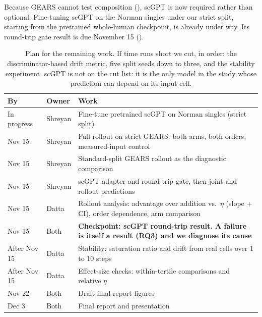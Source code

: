 Because GEARS cannot test composition (), scGPT is now required rather than
optional. Fine-tuning scGPT on the Norman singles under our strict split, starting from the
pretrained whole-human checkpoint, is already under way. Its round-trip gate result is due
November 15 ().

\begin{table}[htb]
\centering
\small
\begin{tabularx}{\linewidth}{llX}
\toprule
By & Owner & Work \\
\midrule
In progress & Shreyan & Fine-tune pretrained scGPT on Norman singles (strict split) \\
Nov 15 & Shreyan & Full rollout on strict GEARS: both arms, both orders, measured-input control \\
Nov 15 & Shreyan & Standard-split GEARS rollout as the diagnostic comparison \\
Nov 15 & Shreyan & scGPT adapter and round-trip gate, then joint and rollout predictions \\
Nov 15 & Datta & Rollout analysis: advantage over addition vs.\ $\eta$ (slope + CI), order dependence, arm comparison \\
\midrule
Nov 15 & Both & \textbf{Checkpoint: scGPT round-trip result. A failure is itself a result (RQ3) and we diagnose its cause} \\
\midrule
After Nov 15 & Datta & Stability: saturation ratio and drift from real cells over 1 to 10 steps \\
After Nov 15 & Datta & Effect-size checks: within-tertile comparisons and relative $\eta$ \\
Nov 22 & Both & Draft final-report figures \\
Dec 3 & Both & Final report and presentation \\
\bottomrule
\end{tabularx}
\caption{Plan for the remaining work. If time runs short we cut, in order: the
discriminator-based drift metric, five split seeds down to three, and the stability experiment.
scGPT is not on the cut list: it is the only model in the study whose prediction can depend on
its input cell.}
\label{tab:timeline}
\end{table}
